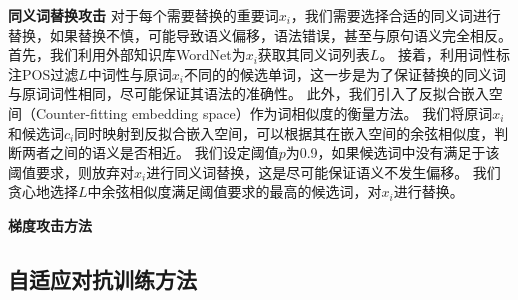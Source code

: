\textbf{同义词替换攻击} \quad 对于每个需要替换的重要词$x_i$，我们需要选择合适的同义词进行替换，如果替换不慎，可能导致语义偏移，语法错误，甚至与原句语义完全相反。
首先，我们利用外部知识库WordNet\cite{miller1995wordnet}为$x_i$获取其同义词列表$L$。
接着，利用词性标注POS过滤$L$中词性与原词$x_i$不同的的候选单词，这一步是为了保证替换的同义词与原词词性相同，尽可能保证其语法的准确性。
此外，我们引入了反拟合嵌入空间（Counter-fitting embedding space）\cite{mrkvsic2016counte}作为词相似度的衡量方法。
我们将原词$x_i$和候选词$c_i$同时映射到反拟合嵌入空间，可以根据其在嵌入空间的余弦相似度，判断两者之间的语义是否相近。
我们设定阈值$p$为0.9，如果候选词中没有满足于该阈值要求，则放弃对$x_i$进行同义词替换，这是尽可能保证语义不发生偏移。
我们贪心地选择$L$中余弦相似度满足阈值要求的最高的候选词，对$x_i$进行替换。

\textbf{梯度攻击方法} \quad 

\subsection{自适应对抗训练方法}














